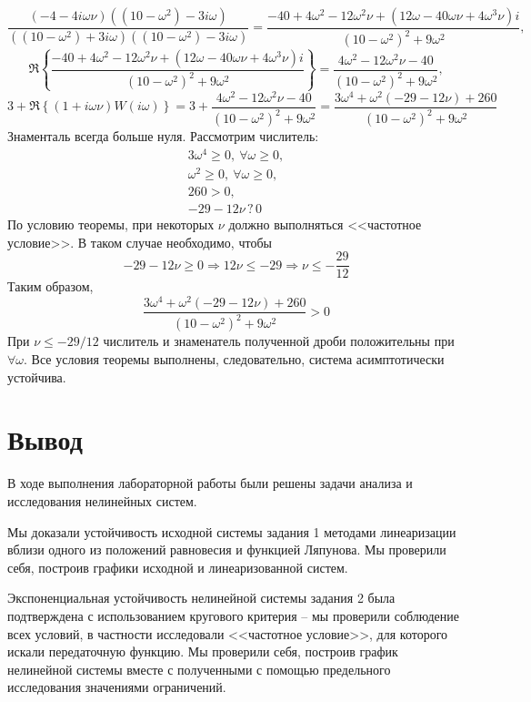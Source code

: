 \documentclass[a4paper, 12pt]{article}
\begin{document}
\begin{compactitem}
        $$\dfrac{(-4-4i\omega\nu)((10-\omega^2)-3i\omega)}{((10-\omega^2)+3i\omega)((10-\omega^2)-3i\omega)}=\dfrac{-40+4\omega^2-12\omega^2\nu+(12\omega-40\omega\nu+4\omega^3\nu)i}{(10-\omega^2)^2+9\omega^2},$$
        $$\Re\left\{\dfrac{-40+4\omega^2-12\omega^2\nu+(12\omega-40\omega\nu+4\omega^3\nu)i}{(10-\omega^2)^2+9\omega^2}\right\}=\dfrac{4\omega^2-12\omega^2\nu-40}{(10-\omega^2)^2+9\omega^2},$$
        $$3+\Re\left\{(1+i\omega\nu)W(i\omega)\right\}=3+\dfrac{4\omega^2-12\omega^2\nu-40}{(10-\omega^2)^2+9\omega^2}=\dfrac{3\omega^4+\omega^2(-29-12\nu)+260}{(10-\omega^2)^2+9\omega^2}$$
        Знаменталь всегда больше нуля. Рассмотрим числитель:
        $$
        \begin{matrix}
            3\omega^4\geq0,\ \forall\omega\geq0,\\
            \omega^2\geq0,\ \forall\omega\geq0,\\
            260>0,\\
            -29-12\nu\,?\,0
        \end{matrix}
        $$
        По условию теоремы, при некоторых $\nu$ должно выполняться <<частотное условие>>.
        В таком случае необходимо, чтобы $$-29-12\nu\geq0\Rightarrow12\nu\leq-29\Rightarrow\nu\leq-\dfrac{29}{12}$$
        Таким образом,
        $$\dfrac{3\omega^4+\omega^2(-29-12\nu)+260}{(10-\omega^2)^2+9\omega^2}>0$$
        При $\nu\leq-29/12$ числитель и знаменатель
        полученной дроби положительны при $\forall\omega$.
        Все условия теоремы выполнены, следовательно, система
        асимптотически устойчива.
    \end{compactitem}


    \section{Вывод}
    В ходе выполнения лабораторной работы были
    решены задачи анализа и исследования нелинейных систем.


    Мы доказали устойчивость исходной системы задания 1 методами
    линеаризации вблизи одного из положений равновесия и функцией
    Ляпунова. Мы проверили себя, построив графики исходной и линеаризованной систем.


    Экспоненциальная устойчивость нелинейной системы задания 2 была
    подтверждена с использованием кругового критерия -- мы проверили
    соблюдение всех условий, в частности исследовали <<частотное условие>>,
    для которого искали передаточную функцию. Мы проверили себя, построив
    график нелинейной системы вместе с полученными с помощью
    предельного исследования значениями ограничений.
\end{document}
